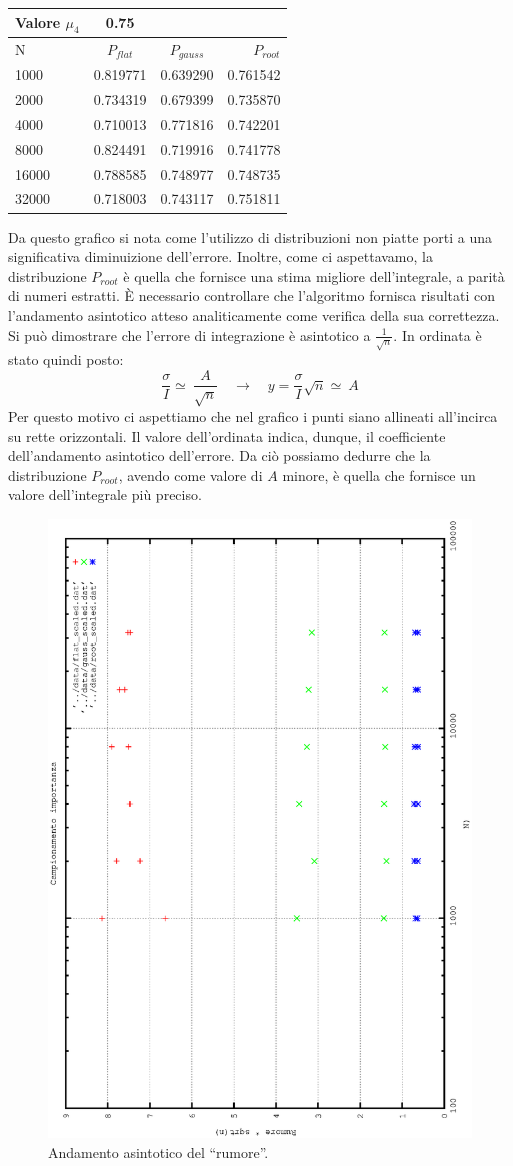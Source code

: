 \begin{center}
 \begin{longtable}[ht]{lccr}
  \toprule
  Valore $\mu_4$ & 0.75 & & \\
  \midrule
  N & $P_{flat}$ & $P_{gauss} $  & $P_{root}$ \\
  \midrule
1000   & 0.819771 & 	0.639290&0.761542    \\
2000   & 0.734319 & 	0.679399&0.735870   \\
4000   & 0.710013 & 	0.771816&0.742201   \\
8000   & 0.824491 & 	0.719916&0.741778   \\
16000  & 0.788585 & 	0.748977&0.748735   \\
32000  & 0.718003 & 	0.743117&0.751811   \\
  \bottomrule
  \end{longtable}
\end{center}

Da questo grafico si nota come l'utilizzo di distribuzioni non piatte porti a una significativa diminuizione dell'errore. Inoltre, come ci aspettavamo,
la distribuzione $P_{root}$ è quella che fornisce una stima migliore dell'integrale, a parità di numeri estratti.
È necessario controllare che l'algoritmo fornisca risultati con l'andamento asintotico atteso analiticamente come verifica della sua correttezza.
Si può dimostrare che l'errore di integrazione è asintotico a $ \frac{1}{\sqrt{n}}$. In ordinata è stato quindi posto:
$$
 \frac{ \sigma}{I} \simeq  \ \frac{A}{\sqrt{n}} \quad  \longrightarrow \quad y = \frac{ \sigma}{I} \sqrt{n}\simeq \ A 
$$
 Per questo motivo ci aspettiamo che nel grafico i punti siano allineati all'incirca su rette orizzontali. Il valore dell'ordinata indica, dunque,
 il coefficiente dell'andamento asintotico dell'errore. Da ciò possiamo dedurre che la distribuzione $P_{root}$, avendo come valore di $A$ minore,
 è quella che fornisce un valore dell'integrale più preciso.
\begin{figure}[hb]
\centering
\includegraphics[width=0.5\columnwidth,angle=-90]{importanza_noise.eps}
\caption{\small{Andamento asintotico del ``rumore''.}}
\end{figure}


